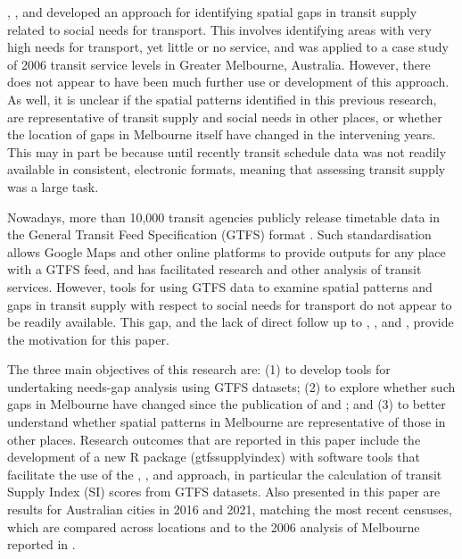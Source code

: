 \documentclass[preprint, 3p,
authoryear]{elsarticle} %
\begin{document}
\citet{Currie2003Hobart}, \citet{Currie2004Gap},
\citet{Currie2007Identifying} and \citet{currie2010identifying}
developed an approach for identifying spatial gaps in transit supply
related to social needs for transport. This involves identifying areas
with very high needs for transport, yet little or no service, and was
applied to a case study of 2006 transit service levels in Greater
Melbourne, Australia. However, there does not appear to have been much
further use or development of this approach. As well, it is unclear if
the spatial patterns identified in this previous research, are
representative of transit supply and social needs in other places, or
whether the location of gaps in Melbourne itself have changed in the
intervening years. This may in part be because until recently transit
schedule data was not readily available in consistent, electronic
formats, meaning that assessing transit supply was a large task.

Nowadays, more than 10,000 transit agencies publicly release timetable
data in the General Transit Feed Specification (GTFS) format
\citep{GTFS}. Such standardisation allows Google Maps and other online
platforms to provide outputs for any place with a GTFS feed, and has
facilitated research and other analysis of transit services. However,
tools for using GTFS data to examine spatial patterns and gaps in
transit supply with respect to social needs for transport do not appear
to be readily available. This gap, and the lack of direct follow up to
\citet{Currie2003Hobart}, \citet{Currie2004Gap},
\citet{Currie2007Identifying} and \citet{currie2010identifying}, provide
the motivation for this paper.

The three main objectives of this research are: (1) to develop tools for
undertaking needs-gap analysis using GTFS datasets; (2) to explore
whether such gaps in Melbourne have changed since the publication of
\citet{Currie2007Identifying} and \citet{currie2010identifying}; and (3)
to better understand whether spatial patterns in Melbourne are
representative of those in other places. Research outcomes that are
reported in this paper include the development of a new R package
(gtfssupplyindex) with software tools that facilitate the use of the
\citet{Currie2003Hobart}, \citet{Currie2004Gap},
\citet{Currie2007Identifying} and \citet{currie2010identifying}
approach, in particular the calculation of transit Supply Index (SI)
scores from GTFS datasets. Also presented in this paper are results for
Australian cities in 2016 and 2021, matching the most recent censuses,
which are compared across locations and to the 2006 analysis of
Melbourne reported in \citet{currie2010identifying}.
\end{document}

